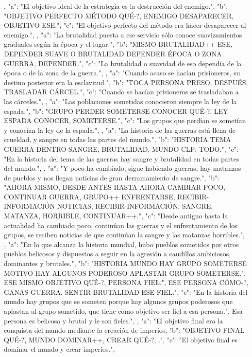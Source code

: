 ,
{
"a": "El objetivo ideal de la estrategia es la destrucción del enemigo.",
"b": "OBJETIVO PERFECTO MÉTODO QUÉ-?, ENEMIGO DESAPARECER, OBJETIVO ESE.",
"c": "El objetivo perfecto del método era hacer desaparecer al enemigo.",
}
,
{
"a": "La brutalidad puesta a ese servicio sólo conoce suavizamientos graduales según la época y el lugar.",
"b": "MISMO BRUTALIDAD++ ESE, DEPENDER SUAVE O BRUTALIDAD DEPENDER ÉPOCA O ZONA GUERRA, DEPENDER.",
"c": "La brutalidad o suavidad de eso dependía de la época o de la zona de la guerra.",
}
,
{
"a": "Cuando acaso se hacían prisioneros, su destino posterior era la esclavitud.",
"b": "TOCA PERSONA PRESO, DESPUÉS, TRASLADAR CÁRCEL.",
"c": "Cuando se hacían prisioneros se trasladaban a las cárceles.",
}
,
{
"a": "Las poblaciones sometidas conocieron siempre la ley de la espada.",
"b": "GRUPO PERDER SOMETERSE CONOCER QUÉ-?, LEY ESPADA CONOCER, SOMETERSE.",
"c": "Los grupos que perdían se sometían y conocían la ley de la espada.",
}
,
{
"a": "La historia de las guerras está llena de crueldad, y sangre en todas las partes del mundo.",
"b": "HISTORIA TEMA GUERRA DENTRO SANGRE, BRUTALIDAD, MUNDO CLP:  TODO.",
"c": "En la historia del tema de las guerras hay sangre y brutalidad en todas partes del mundo.",
}
,
{
"a": "Y poco ha cambiado, sigue habiendo guerras, hay matanzas de pueblos y nos llegan noticias de gran derramamiento de sangre.",
"b": "AHORA-MISMO, DESDE-ANTES-HASTA-AHORA CAMBIAR POCO, CONTINUAR GUERRA, GRUPO++ ENFRENTARSE, RECIBIR-INFORMACIÓN NOTICIAS, RECIBIR-INFORMACIÓN, SANGRE, MATANZA, HORRIBLE, CONTINUAR++.",
"c": "Desde antiguo hasta la actualidad ha cambiado poco, continúan las guerras y el enfrentamiento de los grupos, se reciben noticias de que continúan la sangre y las matanzas horribles.",
}
,
{
"a": "En lo que alcanza la historia mundial, hubo pueblos sometidos por otros pueblos belicosos y dispuestos a seguir en la agresión a caudillos ambiciosos, dominantes y brutales.",
"b": "HISTORIA MUNDO HAY GRUPO SOMETERSE MOTIVO HAY ALGUNOS PODEROSO APLASTAR GRUPO SOMETERSE.", ESE MISMO OBJETIVO QUÉ-?, PERSONA FIEL.", ESE PERSONA CÓMO-?, GANAS GUERRA, SENTIR BRUTALIDAD ESE FIEL.",
"c": "En la historia del mundo hay grupos que se someten porque hay algunos grupos poderosos que aplastan al grupo sometido, que tiene como objetivo ser fiel a esa persona.", Esa persona es belicosa y brutal y le son fieles.",
}
,
{
"a": "El objetivo final era la conquista del mundo mediante la creación de imperios,
"b": "OBJETIVO FINAL QUÉ-?, MUNDO DOMINAR++, CREAR QUÉ-?, .",
"c": "El objetivo final es dominar el mundo y crear imperios.",
}
